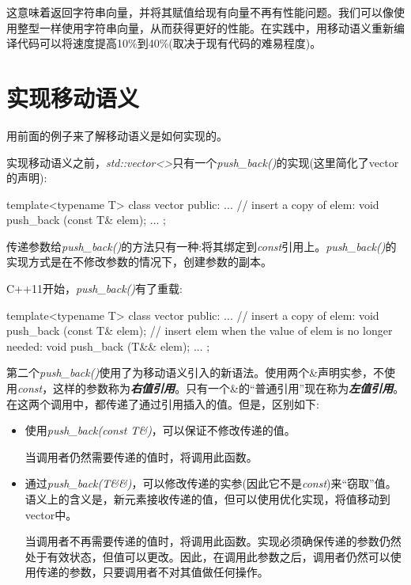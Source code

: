 这意味着返回字符串向量，并将其赋值给现有向量不再有性能问题。我们可以像使用整型一样使用字符串向量，从而获得更好的性能。在实践中，用移动语义重新编译代码可以将速度提高10\%到40\%(取决于现有代码的难易程度)。\par


\section{实现移动语义}

用前面的例子来了解移动语义是如何实现的。\par

实现移动语义之前，\textit{std::\allowbreak{}vector<\allowbreak{}>}只有一个\textit{push\_\allowbreak{}back(\allowbreak{})\allowbreak{}}的实现(这里简化了vector的声明):\par

\begin{codebox}[cpp]
template<typename T>
class vector {
  public:
  ...
  // insert a copy of elem:
  void push_back (const T& elem);
  ...
};
\end{codebox}

传递参数给\textit{push\_\allowbreak{}back(\allowbreak{})\allowbreak{}}的方法只有一种:将其绑定到\textit{const}引用上。\textit{push\_\allowbreak{}back(\allowbreak{})\allowbreak{}}的实现方式是在不修改参数的情况下，创建参数的副本。\par

C++11开始，\textit{push\_\allowbreak{}back(\allowbreak{})\allowbreak{}}有了重载:\par

\begin{codebox}[cpp]
template<typename T>
class vector {
  public:
  ...
  // insert a copy of elem:
  void push_back (const T& elem);
  // insert elem when the value of elem is no longer needed:
  void push_back (T&& elem);
  ...
};
\end{codebox}

第二个\textit{push\_\allowbreak{}back(\allowbreak{})\allowbreak{}}使用了为移动语义引入的新语法。使用两个\&声明实参，不使用\textit{const}，这样的参数称为\textit{\textbf{右值引用}}。只有一个\&的“普通引用”现在称为\textit{\textbf{左值引用}}。在这两个调用中，都传递了通过引用插入的值。但是，区别如下:\par

\begin{itemize}
  \item 使用\textit{push\_\allowbreak{}back(\allowbreak{}const T\&)\allowbreak{}}，可以保证不修改传递的值。\par
  当调用者仍然需要传递的值时，将调用此函数。
  \item 通过\textit{push\_\allowbreak{}back(\allowbreak{}T\&\&)\allowbreak{}}，可以修改传递的实参(因此它不是\textit{const})来“窃取”值。语义上的含义是，新元素接收传递的值，但可以使用优化实现，将值移动到vector中。\par
  当调用者不再需要传递的值时，将调用此函数。实现必须确保传递的参数仍然处于有效状态，但值可以更改。因此，在调用此参数之后，调用者仍然可以使用传递的参数，只要调用者不对其值做任何操作。
\end{itemize}

